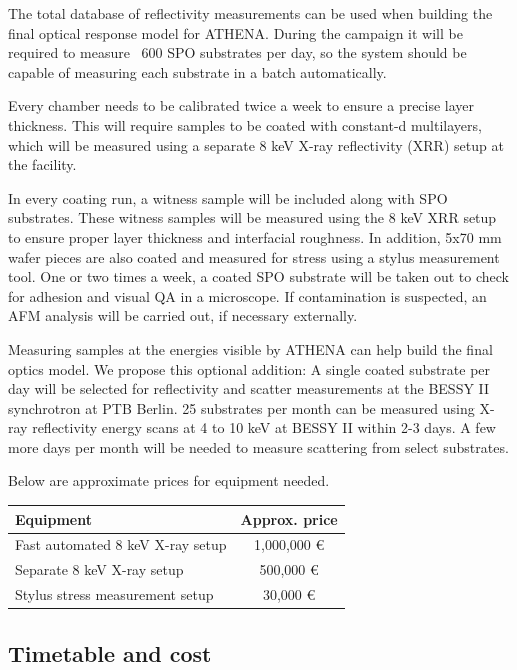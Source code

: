 The total database of reflectivity measurements can be used when building the final optical response model for ATHENA. During the campaign it will be required to measure ~600 SPO substrates per day, so the system should be capable of measuring each substrate in a batch automatically.

Every chamber needs to be calibrated twice a week to ensure a precise layer thickness. This will require samples to be coated with constant-d multilayers, which will be measured using a separate 8 keV X-ray reflectivity (XRR) setup at the facility.

In every coating run, a witness sample will be included along with SPO substrates. These witness samples will be measured using the 8 keV XRR setup to ensure proper layer thickness and interfacial roughness. In addition, 5x70 mm wafer pieces are also coated and measured for stress using a stylus measurement tool. One or two times a week, a coated SPO substrate will be taken out to check for adhesion and visual QA in a microscope. If contamination is suspected, an AFM analysis will be carried out, if necessary externally.

Measuring samples at the energies visible by ATHENA can help build the final optics model. We propose this optional addition: A single coated substrate per day will be selected for reflectivity and scatter measurements at the BESSY II synchrotron at PTB Berlin. 25 substrates per month can be measured using X-ray reflectivity energy scans at 4 to 10 keV at BESSY II within 2-3 days. A few more days per month will be needed to measure scattering from select substrates.

Below are approximate prices for equipment needed.

\begin{table}[htbp]
	\centering
\begin{tabular}{l|c}
Equipment & Approx. price\\
\hline
\hline
Fast automated 8 keV X-ray setup  & 1,000,000 \euro\\
\hline
Separate 8 keV X-ray setup & 500,000 \euro\\
\hline
Stylus stress measurement setup & 30,000 \euro\\
\end{tabular}
\end{table}



\subsection{Timetable and cost}

